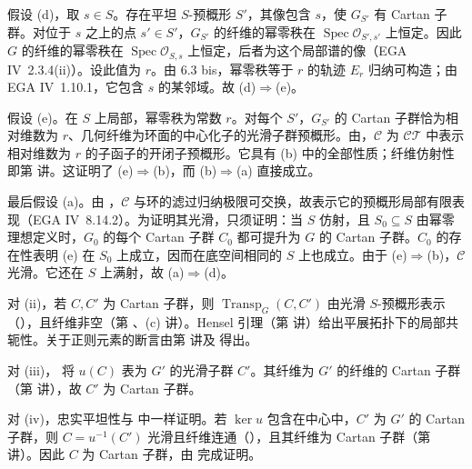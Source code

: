 假设 (d)，取 \(s\in S\)。存在平坦 \(S\)-预概形 \(S'\)，其像包含 \(s\)，使 \(G_{S'}\) 有 Cartan 子群。对位于 \(s\) 之上的点 \(s'\in S'\)，\(G_{S'}\) 的纤维的幂零秩在 \(\operatorname{Spec}\mathcal O_{S',s'}\) 上恒定。因此 \(G\) 的纤维的幂零秩在 \(\operatorname{Spec}\mathcal O_{S,s}\) 上恒定，后者为这个局部谱的像（EGA IV~2.3.4(ii)）。设此值为 \(r\)。由 6.3 bis，幂零秩等于 \(r\) 的轨迹 \(E_r\) 归纳可构造；由 EGA IV~1.10.1，它包含 \(s\) 的某邻域。故 (d)\(\Rightarrow\)(e)。

假设 (e)。在 \(S\) 上局部，幂零秩为常数 \(r\)。对每个 \(S'\)，\(G_{S'}\) 的 Cartan 子群恰为相对维数为 \(r\)、几何纤维为环面的中心化子的光滑子群预概形。由，\(\mathcal C\) 为 \(\mathcal{CT}\) 中表示相对维数为 \(r\) 的子函子的开闭子预概形。它具有 (b) 中的全部性质；纤维仿射性即第  讲。这证明了 (e)\(\Rightarrow\)(b)，而 (b)\(\Rightarrow\)(a) 直接成立。

最后假设 (a)。由 ，\(\mathcal C\) 与环的滤过归纳极限可交换，故表示它的预概形局部有限表现（EGA IV~8.14.2）。为证明其光滑，只须证明：当 \(S\) 仿射，且 \(S_0\subseteq S\) 由幂零理想定义时，\(G_0\) 的每个 Cartan 子群 \(C_0\) 都可提升为 \(G\) 的 Cartan 子群。\(C_0\) 的存在性表明 (e) 在 \(S_0\) 上成立，因而在底空间相同的 \(S\) 上也成立。由于 (e)\(\Rightarrow\)(b)，\(\mathcal C\) 光滑。它还在 \(S\) 上满射，故 (a)\(\Rightarrow\)(d)。

对 (ii)，若 \(C,C'\) 为 Cartan 子群，则 \(\operatorname{Transp}_G(C,C')\) 由光滑 \(S\)-预概形表示（），且纤维非空（第 、(c) 讲）。Hensel 引理（第  讲）给出平展拓扑下的局部共轭性。关于正则元素的断言由第  讲及  得出。

对 (iii)， 将 \(u(C)\) 表为 \(G'\) 的光滑子群 \(C'\)。其纤维为 \(G'\) 的纤维的 Cartan 子群（第  讲），故 \(C'\) 为 Cartan 子群。

对 (iv)，忠实平坦性与 中一样证明。若 \(\ker u\) 包含在中心中，\(C'\) 为 \(G'\) 的 Cartan 子群，则 \(C=u^{-1}(C')\) 光滑且纤维连通（），且其纤维为 Cartan 子群（第  讲）。因此 \(C\) 为 Cartan 子群，由 完成证明。

